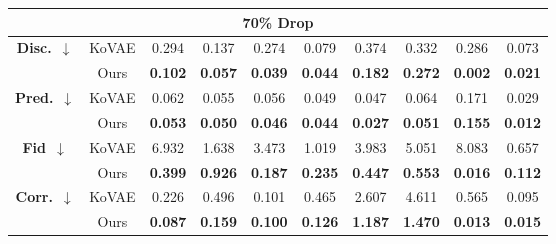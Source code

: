 \documentclass{article}
\theoremstyle{plain}
\theoremstyle{definition}
\theoremstyle{remark}
\begin{document}
{\begin{table*}[!t]
{\begin{tabular}{cc|cccccccc}
    \multicolumn{10}{c}{\textbf{70\% Drop}} \\
    \midrule
    \multirow{2}{*}{\textbf{Disc.}~$\downarrow$}
      & KoVAE  & 0.294 & 0.137 & 0.274 & 0.079 & 0.374 & 0.332 & 0.286 & 0.073 \\
      & Ours   & \cellcolor{blue!10}\textbf{0.102}
               & \cellcolor{blue!10}\textbf{0.057}
               & \cellcolor{blue!10}\textbf{0.039}
               & \cellcolor{blue!10}\textbf{0.044}
               & \cellcolor{blue!10}\textbf{0.182}
               & \cellcolor{blue!10}\textbf{0.272}
               & \cellcolor{blue!10}\textbf{0.002}
               & \cellcolor{blue!10}\textbf{0.021} \\
    \midrule
    \multirow{2}{*}{\textbf{Pred.}~$\downarrow$} 
      & KoVAE  & 0.062 & 0.055 & 0.056 & 0.049 & 0.047 & 0.064 & 0.171 & 0.029 \\
      & Ours   & \cellcolor{blue!10}\textbf{0.053}
               & \cellcolor{blue!10}\textbf{0.050}
               & \cellcolor{blue!10}\textbf{0.046}
               & \cellcolor{blue!10}\textbf{0.044}
               & \cellcolor{blue!10}\textbf{0.027}
               & \cellcolor{blue!10}\textbf{0.051}
               & \cellcolor{blue!10}\textbf{0.155}
               & \cellcolor{blue!10}\textbf{0.012} \\
    \midrule
    \multirow{2}{*}{\textbf{Fid}~$\downarrow$}     
      & KoVAE  & 6.932 & 1.638 & 3.473 & 1.019 & 3.983 & 5.051 & 8.083 & 0.657 \\
      & Ours   & \cellcolor{blue!10}\textbf{0.399}
               & \cellcolor{blue!10}\textbf{0.926}
               & \cellcolor{blue!10}\textbf{0.187}
               & \cellcolor{blue!10}\textbf{0.235}
               & \cellcolor{blue!10}\textbf{0.447}
               & \cellcolor{blue!10}\textbf{0.553}
               & \cellcolor{blue!10}\textbf{0.016}
               & \cellcolor{blue!10}\textbf{0.112} \\
    \midrule
    \multirow{2}{*}{\textbf{Corr.}~$\downarrow$}     
      & KoVAE  & 0.226 & 0.496 & 0.101 & 0.465 & 2.607 & 4.611 & 0.565 & 0.095 \\
      & Ours   & \cellcolor{blue!10}\textbf{0.087}
               & \cellcolor{blue!10}\textbf{0.159}
               & \cellcolor{blue!10}\textbf{0.100}
               & \cellcolor{blue!10}\textbf{0.126}
               & \cellcolor{blue!10}\textbf{1.187}
               & \cellcolor{blue!10}\textbf{1.470}
               & \cellcolor{blue!10}\textbf{0.013}
               & \cellcolor{blue!10}\textbf{0.015} \\
    \bottomrule
\end{tabular}
}
\end{table*}



}
\end{document}
